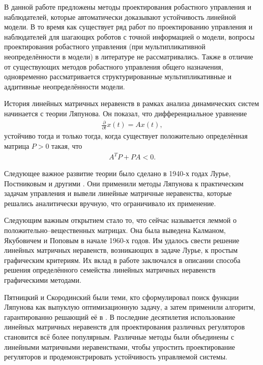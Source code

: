 В данной работе предложены методы проектирования робастного управления и наблюдателей, которые автоматически доказывают устойчивость линейной модели. В то время как существует ряд работ по проектированию управления и наблюдателей для шагающих роботов с точной информацией о модели, вопросы проектирования робастного управления (при мультипликативной неопределённости в модели) в литературе не рассматривались. Также в отличие от существующих методов робастного управления общего назначения, одновременно рассматривается структурированные мультипликативные и аддитивные неопределённости модели.

{\progress}

История линейных матричных неравенств в рамках анализа динамических систем начинается с теории Ляпунова. Он показал, что дифференциальное уравнение
\begin{align*}
	\frac{\partial}{\partial t}x(t)=Ax(t),
\end{align*}
устойчиво тогда и только тогда, когда существует положительно определённая матрица $P > 0$ такая, что
\begin{align*}
	A^T P + P A < 0.
\end{align*}

Следующее важное развитие теории было сделано в 1940-х годах Лурье, Постниковым и другими \cite{LMI1}. 
Они применили методы Ляпунова к практическим задачам управления и вывели линейные матричные неравенства, которые решались аналитически вручную, что ограничивало их применение. 

Следующим важным открытием стало то, что сейчас называется леммой о положительно--вещественных матрицах. Она была выведена Калманом, Якубовичем и Поповым в начале 1960-х годов. Им удалось свести решение линейных матричных неравенств, возникающих в задаче Лурье, к простым графическим критериям. Их вклад в работе \cite{LMI2} заключался в описании способа решения определённого семейства линейных матричных неравенств графическими методами.

Пятницкий и Скородинский были теми, кто сформулировал поиск функции Ляпунова как выпуклую оптимизационную задачу, а затем применили алгоритм, гарантированно решающий её в \cite{LMI3}.
В последние десятилетия использование линейных матричных неравенств для проектирования различных регуляторов становится всё более популярным. Различные методы \cite{LMI4, LMI5} были объединены с линейными матричными неравенствами, чтобы упростить проектирование регуляторов и продемонстрировать устойчивость управляемой системы.

